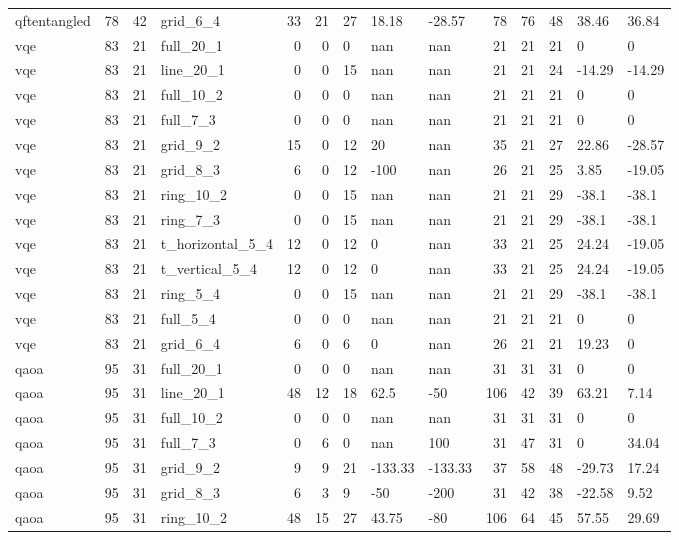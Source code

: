 \begin{longtable}{lrrlrrlllrrlll}
qftentangled & 78 & 42 & grid\_6\_4 & 33 & 21 & 27 & 18.18 & -28.57 & 78 & 76 & 48 & 38.46 & 36.84 \\
vqe & 83 & 21 & full\_20\_1 & 0 & 0 & 0 & nan & nan & 21 & 21 & 21 & 0 & 0 \\
vqe & 83 & 21 & line\_20\_1 & 0 & 0 & 15 & nan & nan & 21 & 21 & 24 & -14.29 & -14.29 \\
vqe & 83 & 21 & full\_10\_2 & 0 & 0 & 0 & nan & nan & 21 & 21 & 21 & 0 & 0 \\
vqe & 83 & 21 & full\_7\_3 & 0 & 0 & 0 & nan & nan & 21 & 21 & 21 & 0 & 0 \\
vqe & 83 & 21 & grid\_9\_2 & 15 & 0 & 12 & 20 & nan & 35 & 21 & 27 & 22.86 & -28.57 \\
vqe & 83 & 21 & grid\_8\_3 & 6 & 0 & 12 & -100 & nan & 26 & 21 & 25 & 3.85 & -19.05 \\
vqe & 83 & 21 & ring\_10\_2 & 0 & 0 & 15 & nan & nan & 21 & 21 & 29 & -38.1 & -38.1 \\
vqe & 83 & 21 & ring\_7\_3 & 0 & 0 & 15 & nan & nan & 21 & 21 & 29 & -38.1 & -38.1 \\
vqe & 83 & 21 & t\_horizontal\_5\_4 & 12 & 0 & 12 & 0 & nan & 33 & 21 & 25 & 24.24 & -19.05 \\
vqe & 83 & 21 & t\_vertical\_5\_4 & 12 & 0 & 12 & 0 & nan & 33 & 21 & 25 & 24.24 & -19.05 \\
vqe & 83 & 21 & ring\_5\_4 & 0 & 0 & 15 & nan & nan & 21 & 21 & 29 & -38.1 & -38.1 \\
vqe & 83 & 21 & full\_5\_4 & 0 & 0 & 0 & nan & nan & 21 & 21 & 21 & 0 & 0 \\
vqe & 83 & 21 & grid\_6\_4 & 6 & 0 & 6 & 0 & nan & 26 & 21 & 21 & 19.23 & 0 \\
qaoa & 95 & 31 & full\_20\_1 & 0 & 0 & 0 & nan & nan & 31 & 31 & 31 & 0 & 0 \\
qaoa & 95 & 31 & line\_20\_1 & 48 & 12 & 18 & 62.5 & -50 & 106 & 42 & 39 & 63.21 & 7.14 \\
qaoa & 95 & 31 & full\_10\_2 & 0 & 0 & 0 & nan & nan & 31 & 31 & 31 & 0 & 0 \\
qaoa & 95 & 31 & full\_7\_3 & 0 & 6 & 0 & nan & 100 & 31 & 47 & 31 & 0 & 34.04 \\
qaoa & 95 & 31 & grid\_9\_2 & 9 & 9 & 21 & -133.33 & -133.33 & 37 & 58 & 48 & -29.73 & 17.24 \\
qaoa & 95 & 31 & grid\_8\_3 & 6 & 3 & 9 & -50 & -200 & 31 & 42 & 38 & -22.58 & 9.52 \\
qaoa & 95 & 31 & ring\_10\_2 & 48 & 15 & 27 & 43.75 & -80 & 106 & 64 & 45 & 57.55 & 29.69 \\

\end{longtable}
